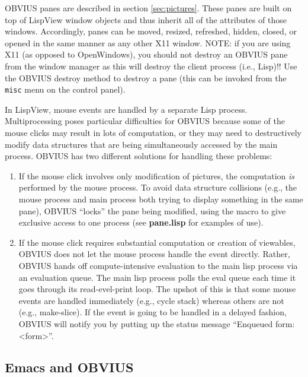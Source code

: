 OBVIUS panes are described in section \ref{sec:pictures}.  These panes
are built on top of LispView window objects and thus inherit all of
the attributes of those windows.  Accordingly, panes can be moved,
resized, refreshed, hidden, closed, or opened in the same manner as
any other X11 window.  NOTE: if you are using X11 (as opposed to
OpenWindows), you should not destroy an OBVIUS pane from the window
manager as this will destroy the client process (i.e., Lisp)!!  Use
the OBVIUS destroy method to destroy a pane (this can be invoked from
the {\tt misc} menu on the control panel).

In LispView, mouse events are handled by a separate Lisp process.
Multiprocessing poses particular difficulties for OBVIUS because some
of the mouse clicks may result in lots of computation, or they may
need to destructively modify data structures that are being
simultaneously accessed by the main process.  OBVIUS has two different
solutions for handling these problems:
\begin{enumerate}
\item If the mouse click involves only modification of pictures,
the computation {\em is} performed by the mouse process.  To avoid
data structure collisions (e.g., the mouse process and main process
both trying to display something in the same pane), OBVIUS ``locks''
the pane being modified, using the macro
 to give exclusive access to one process (see
{\bf pane.lisp} for examples of use).

\item If the mouse click requires substantial computation or
creation of viewables, OBVIUS does not let the mouse process handle
the event directly.  Rather, OBVIUS hands off compute-intensive
evaluation to the main lisp process via an evaluation queue.  The
main lisp process polls the eval queue each time it goes through its
read-evel-print loop.  The upshot of this is that some mouse events
are handled immediately (e.g., cycle stack) whereas others are not
(e.g., make-slice).  If the event is going to be handled in a delayed
fashion, OBVIUS will notify you by putting up the status message
``Enqueued form: <form>''.
\end{enumerate}


\subsection{Emacs and OBVIUS}


